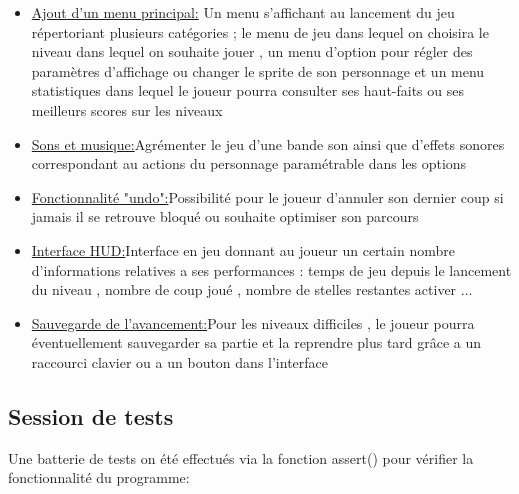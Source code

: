 \documentclass{article}
\begin{document}
	 \begin{itemize}
	 	\item\underline{Ajout d'un menu principal:} Un menu s'affichant au lancement du jeu répertoriant plusieurs catégories ; le menu de jeu dans lequel on choisira le niveau dans lequel on souhaite jouer , un menu d'option pour régler des paramètres d'affichage ou changer le sprite de son personnage et un menu statistiques dans lequel le joueur pourra consulter ses haut-faits ou ses meilleurs scores sur les niveaux
	 	\vspace{0.5cm}
	 	\item\underline{Sons et musique:}Agrémenter le jeu d'une bande son ainsi que d'effets sonores correspondant au actions du personnage paramétrable  dans les options 
	 	\vspace{0.5cm}
	 	\item\underline{Fonctionnalité "undo":}Possibilité pour le joueur d'annuler son dernier coup si jamais il se retrouve bloqué ou souhaite optimiser son parcours
	 	\vspace{0.5cm}
	 	\item\underline{Interface HUD:}Interface en jeu donnant au joueur un certain nombre d'informations relatives a ses performances : temps de jeu depuis le lancement du niveau , nombre de coup joué , nombre de stelles restantes activer ...
	 	\vspace{0.5cm}
	 	\item\underline{Sauvegarde de l'avancement:}Pour les niveaux difficiles , le joueur pourra éventuellement sauvegarder sa partie et la reprendre plus tard grâce a un raccourci clavier ou a un bouton dans l'interface
	 \end{itemize}
	\newpage
	\begin{center}
	\section{Session de tests}
	\end{center}
	\vspace{1cm}
	Une batterie de tests on été effectués via la fonction assert() pour vérifier la fonctionnalité du programme:
\vspace{1cm}
\end{document}
